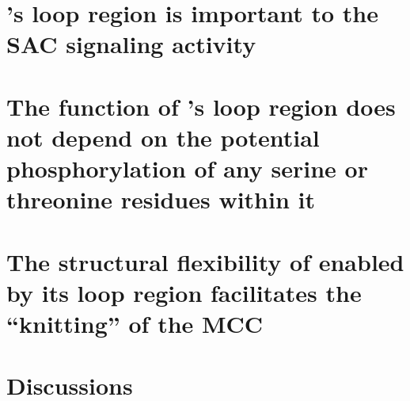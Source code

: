 \section{'s loop region is important to the SAC signaling activity }
\label{LoopDeletionSection}

\section{The function of 's loop region does not depend on the potential phosphorylation of any serine or threonine residues within it}

\section{The structural flexibility of  enabled by its loop region facilitates the ``knitting'' of the MCC}
\label{FinalKnittingModel}


\section{Discussions}
\label{Chapter4Discussions}



